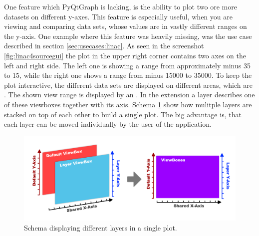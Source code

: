 One feature which PyQtGraph is lacking, is the ability to plot two ore more datasets on different y-axes. This feature is especially useful, when you are viewing and comparing data sets, whose values are in vastly different ranges on the y-axis. One example where this feature was heavily missing, was the use case described in section \ref{sec:usecases:linac}. As seen in the screenshot \ref{fig:linac4sourcegui} the plot in the upper right corner contains two axes on the left and right side. The left one is showing a range from approximately minus 35 to 15, while the right one shows a range from minus 15000 to 35000. To keep the plot interactive, the different data sets are displayed on different areas, which are . The shown view range is displayed by an . In the extension a layer describes one of these viewboxes together with its axis. Schema \ref{fig:application:pyqtgraph:layers} show how mulitple layers are stacked on top of each other to build a single plot. The big advantage is, that each layer can be moved individually by the user of the application.

\begin{figure}[h]
    \centering
    \includegraphics[width=14cm]{resources/img/PyQtGraphLayers}
    \caption{Schema displaying different layers in a single plot.}
    \label{fig:application:pyqtgraph:layers}
\end{figure}

